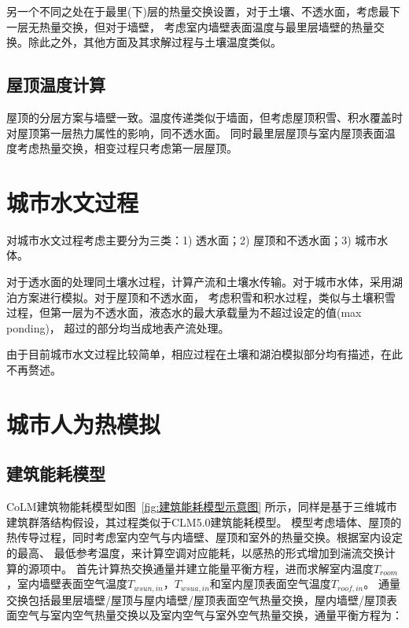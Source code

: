 另一个不同之处在于最里(下)层的热量交换设置，对于土壤、不透水面，考虑最下一层无热量交换，但对于墙壁，
考虑室内墙壁表面温度与最里层墙壁的热量交换。除此之外，其他方面及其求解过程与土壤温度类似。


\subsection{屋顶温度计算}
屋顶的分层方案与墙壁一致。温度传递类似于墙面，但考虑屋顶积雪、积水覆盖时对屋顶第一层热力属性的影响，同不透水面。
同时最里层屋顶与室内屋顶表面温度考虑热量交换，相变过程只考虑第一层屋顶。


\section{城市水文过程}
对城市水文过程考虑主要分为三类：1) 透水面；2) 屋顶和不透水面；3) 城市水体。

对于透水面的处理同土壤水过程，计算产流和土壤水传输。对于城市水体，采用湖泊方案进行模拟。对于屋顶和不透水面，
考虑积雪和积水过程，类似与土壤积雪过程，但第一层为不透水面，液态水的最大承载量为不超过设定的值(max ponding)，
超过的部分均当成地表产流处理。

由于目前城市水文过程比较简单，相应过程在土壤和湖泊模拟部分均有描述，在此不再赘述。


\section{城市人为热模拟}

\subsection{建筑能耗模型}
CoLM建筑物能耗模型如图~\ref{fig:建筑能耗模型示意图} 所示，同样是基于三维城市建筑群落结构假设，其过程类似于CLM5.0建筑能耗模型。
模型考虑墙体、屋顶的热传导过程，同时考虑室内空气与内墙壁、屋顶和室外的热量交换。根据室内设定的最高、
最低参考温度，来计算空调对应能耗，以感热的形式增加到湍流交换计算的源项中。
首先计算热交换通量并建立能量平衡方程，进而求解室内温度$T_{room}$，室内墙壁表面空气温度$T_{wsun,in}$，$T_{wsua,in}$和室内屋顶表面空气温度$T_{roof,in}$。
通量交换包括最里层墙壁/屋顶与屋内墙壁/屋顶表面空气热量交换，屋内墙壁/屋顶表面空气与室内空气热量交换以及室内空气与室外空气热量交换，通量平衡方程为： 

